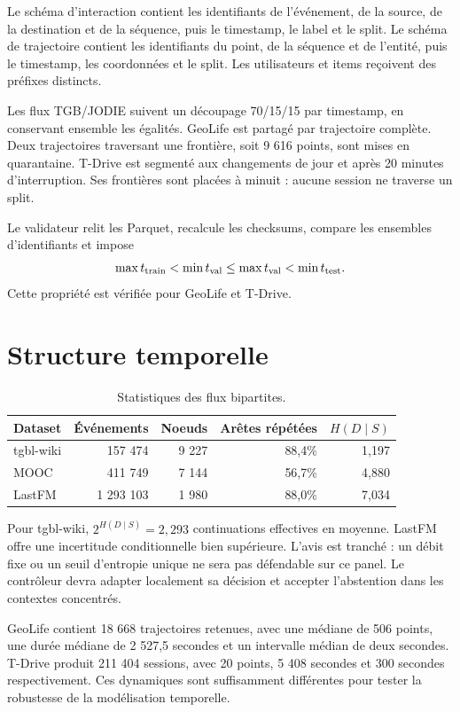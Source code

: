 \documentclass[10pt,a4paper]{article}
\begin{document}
Le schéma d'interaction contient les identifiants de l'événement, de la source,
de la destination et de la séquence, puis le timestamp, le label et le split.
Le schéma de trajectoire contient les identifiants du point, de la séquence et
de l'entité, puis le timestamp, les coordonnées et le split. Les utilisateurs
et items reçoivent des préfixes distincts.

Les flux TGB/JODIE suivent un découpage 70/15/15 par timestamp, en conservant
ensemble les égalités. GeoLife est partagé par trajectoire complète. Deux
trajectoires traversant une frontière, soit 9 616 points, sont mises en
quarantaine. T-Drive est segmenté aux changements de jour et après 20 minutes
d'interruption. Ses frontières sont placées à minuit : aucune session ne
traverse un split.

Le validateur relit les Parquet, recalcule les checksums, compare les ensembles
d'identifiants et impose
\[
 \max t_{\rm train}<\min t_{\rm val}
 \leq\max t_{\rm val}<\min t_{\rm test}.
\]
Cette propriété est vérifiée pour GeoLife et T-Drive.

\section{Structure temporelle}

\begin{table}[H]
\centering
\caption{Statistiques des flux bipartites.}
\begin{tabular}{lrrrr}
\toprule
Dataset & Événements & Noeuds & Arêtes répétées & $H(D\mid S)$\\
\midrule
tgbl-wiki & 157 474 & 9 227 & 88,4\% & 1,197\\
MOOC & 411 749 & 7 144 & 56,7\% & 4,880\\
LastFM & 1 293 103 & 1 980 & 88,0\% & 7,034\\
\bottomrule
\end{tabular}
\end{table}

Pour tgbl-wiki, \(2^{H(D\mid S)}=2,293\) continuations effectives en moyenne.
LastFM offre une incertitude conditionnelle bien supérieure. L'avis est
tranché : un débit fixe ou un seuil d'entropie unique ne sera pas défendable
sur ce panel. Le contrôleur devra adapter localement sa décision et accepter
l'abstention dans les contextes concentrés.

GeoLife contient 18 668 trajectoires retenues, avec une médiane de 506 points,
une durée médiane de 2 527,5 secondes et un intervalle médian de deux secondes.
T-Drive produit 211 404 sessions, avec 20 points, 5 408 secondes et 300
secondes respectivement. Ces dynamiques sont suffisamment différentes pour
tester la robustesse de la modélisation temporelle.
\end{document}
